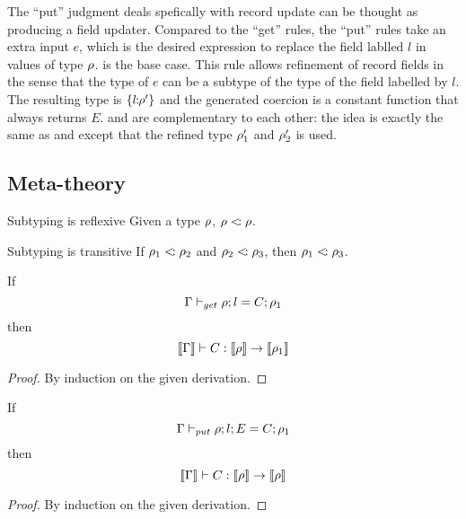 \begin{itemize}
  The ``put'' judgment deals spefically with record update can be thought as
  producing a field updater. Compared to the ``get'' rules, the ``put'' rules
  take an extra input $ e $, which is the desired expression to replace the
  field lablled $ l $ in values of type $ \rho $.  is the base
  case. This rule allows refinement of record fields in the sense that the type
  of $ e $ can be a subtype of the type of the field labelled by $ l $. The
  resulting type is $ \{ {l} \!\!:\!\! {\rho'} \} $ and the generated coercion is a
  constant function that always returns $ E $.  and
   are complementary to each other: the idea is exactly the
  same as  and  except that the refined type
  $ \rho_1' $ and $ \rho_2' $ is used.

\end{itemize}

\subsection{Meta-theory}

\begin{lemma}{Subtyping is reflexive} \label{sub-refl}
Given a type $ \rho $, $ \rho <\!: \rho $.
\end{lemma}

\begin{lemma}{Subtyping is transitive} \label{sub-trans}
If $ \rho_1 <\!: \rho_2 $ and $ \rho_2 <\!: \rho_3 $,
then $ \rho_1 <\!: \rho_3 $.
\end{lemma}


\begin{lemma} \label{type-get}
  If $$ \Gamma \vdash_{get} \rho ; l = C ; \rho_1 $$
  then $$ \llbracket {\Gamma} \rrbracket \vdash C : \llbracket {\rho} \rrbracket \to \llbracket {\rho_1} \rrbracket $$
\end{lemma}

\begin{proof}
By induction on the given derivation.
\end{proof}

\begin{lemma} \label{type-put}
  If $$ \Gamma \vdash_{put} \rho ; l ; E = C ; \rho_1 $$
  then $$ \llbracket {\Gamma} \rrbracket \vdash C : \llbracket {\rho} \rrbracket \to \llbracket {\rho} \rrbracket $$
\end{lemma}

\begin{proof}
By induction on the given derivation.
\end{proof}

